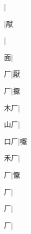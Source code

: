 \begin{multicols}{2}
{{}|{}\par
{\cjk{}{\cnsym{}　}{\cnsym{}　}{\cnsym{}　}}|{\cjk{}猒}\par
{}|{}\par
{\cjk{}{\cnsym{}　}{\cnsym{}　}面}|{}\par
{\cjk{}{\cnsym{}　}{\cnsym{}　}厂}|{\cjk{}厭}\par
{厂}|{\cjk{}擫}\par
{\cjk{}{\cnsym{}　}木厂}|{}\par
{\cjk{}{\cnsym{}　}山厂}|{}\par
{\cjk{}{\cnsym{}　}口厂}|{\cjk{}嚈}\par
{\cjk{}{\cnsym{}　}禾厂}|{}\par
{厂}|{\cjk{}懨}\par
{厂}|{}\par
{厂}|{}\par
{厂}|{}\par
}
\end{multicols}
